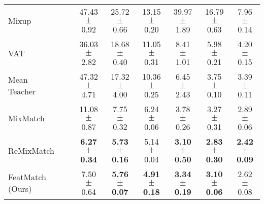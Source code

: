 \documentclass[runningheads]{llncs}
\begin{document}
\begin{table*}[t]
{\begin{tabular}{@{\extracolsep{4pt}}lccccccc@{}}
Mixup~\cite{zhang2018mixup}                    & & 47.43 $\pm$ 0.92 & 25.72 $\pm$ 0.66 & 13.15 $\pm$ 0.20 & 39.97 $\pm$ 1.89 & 16.79 $\pm$ 0.63 & 7.96 $\pm$ 0.14 \\
VAT~\cite{miyato2018virtual}                   & & 36.03 $\pm$ 2.82 & 18.68 $\pm$ 0.40 & 11.05 $\pm$ 0.31 &  8.41 $\pm$ 1.01 &  5.98 $\pm$ 0.21 & 4.20 $\pm$ 0.15 \\
Mean Teacher~\cite{tarvainen2017mean}          & & 47.32 $\pm$ 4.71 & 17.32 $\pm$ 4.00 & 10.36 $\pm$ 0.25 &  6.45 $\pm$ 2.43 &  3.75 $\pm$ 0.10 & 3.39 $\pm$ 0.11 \\
MixMatch~\cite{berthelot2019mixmatch}          & & 11.08 $\pm$ 0.87 &  7.75 $\pm$ 0.32 &  6.24 $\pm$ 0.06 &  3.78 $\pm$ 0.26 &  3.27 $\pm$ 0.31 & 2.89 $\pm$ 0.06 \\
ReMixMatch~\cite{berthelot2019remixmatch}      & &  \textbf{6.27 $\pm$ 0.34} &  \textbf{5.73 $\pm$ 0.16} &  5.14 $\pm$ 0.04 &  \textbf{3.10 $\pm$ 0.50} &  \textbf{2.83 $\pm$ 0.30} & \textbf{2.42 $\pm$ 0.09} \\
FeatMatch (Ours)                               & &  7.50 $\pm$ 0.64 &  \textbf{5.76 $\pm$ 0.07} &  \textbf{4.91 $\pm$ 0.18} &  \textbf{3.34 $\pm$ 0.19} &  \textbf{3.10 $\pm$ 0.06} & 2.62 $\pm$ 0.08 \\
\bottomrule
\end{tabular}
}
\end{table*}
 \begin{table*}[t]
\centering
\caption{
Ablation study on CIFAR-10 with various amount of labeled samples.
}
\label{table:ablation}
\end{table*}
 
\end{document}
